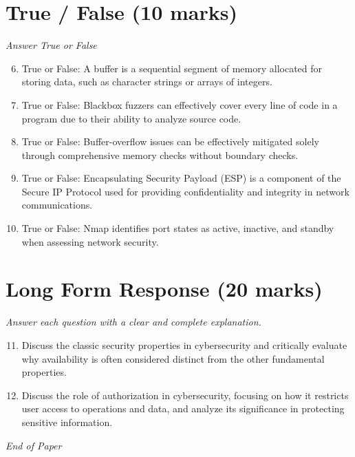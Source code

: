 \documentclass[12pt]{article}
\begin{document}
\section*{True / False (10 marks)}
\textit{Answer True or False}
\begin{enumerate}[label=\arabic*.]
\setcounter{enumi}{5}
\item True or False: A buffer is a sequential segment of memory allocated for storing data, such as character strings or arrays of integers.
\item True or False: Blackbox fuzzers can effectively cover every line of code in a program due to their ability to analyze source code.
\item True or False: Buffer-overflow issues can be effectively mitigated solely through comprehensive memory checks without boundary checks.
\item True or False: Encapsulating Security Payload (ESP) is a component of the Secure IP Protocol used for providing confidentiality and integrity in network communications.
\item True or False: Nmap identifies port states as active, inactive, and standby when assessing network security.
\end{enumerate}

\section*{Long Form Response (20 marks)}
\textit{Answer each question with a clear and complete explanation.}
\begin{enumerate}[label=\arabic*.]
\setcounter{enumi}{10}
\item Discuss the classic security properties in cybersecurity and critically evaluate why availability is often considered distinct from the other fundamental properties.
\item Discuss the role of authorization in cybersecurity, focusing on how it restricts user access to operations and data, and analyze its significance in protecting sensitive information.
\end{enumerate}

\vfill
\noindent\textit{End of Paper}
\end{document}
